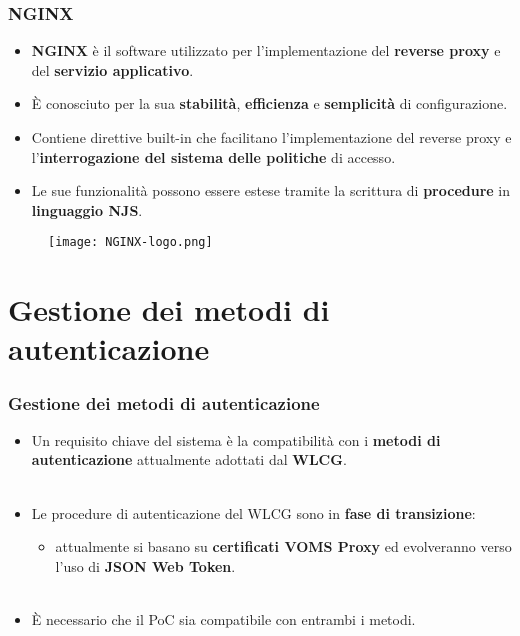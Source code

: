 \documentclass{beamer}
\begin{document}
\begin{frame}
  \frametitle{NGINX}
  \begin{itemize}
    \item \textbf{NGINX} è il software utilizzato per l'implementazione del \textbf{reverse proxy} e del \textbf{servizio applicativo}.
    \item È conosciuto per la sua \textbf{stabilità}, \textbf{efficienza} e \textbf{semplicità} di configurazione.
    \item Contiene direttive built-in che facilitano l'implementazione del reverse proxy e l'\textbf{interrogazione del sistema delle politiche} di accesso. 
    \item Le sue funzionalità possono essere estese tramite la scrittura di \textbf{procedure} in \textbf{linguaggio NJS}. 
  \end{itemize}  
  
  \begin{figure}[h]
    \texttt{[image: NGINX-logo.png]}
    \centering
  \end{figure}
  
\end{frame}

\section[Autenticazione]{Gestione dei metodi di autenticazione}

\begin{frame}
  \frametitle{Gestione dei metodi di autenticazione}
  \begin{itemize}
    \item Un requisito chiave del sistema è la compatibilità con i \textbf{metodi di autenticazione} attualmente adottati dal \textbf{WLCG}.
    \\~\
    \item Le procedure di autenticazione del WLCG sono in \textbf{fase di transizione}:
    \begin{itemize}
      \item 
      attualmente si basano su \textbf{certificati VOMS Proxy} ed evolveranno verso l'uso di \textbf{JSON Web Token}. \\~\
    \end{itemize}
    
    \item È necessario che il PoC sia compatibile con entrambi i metodi. 
  \end{itemize}  
\end{frame}
\end{document}
